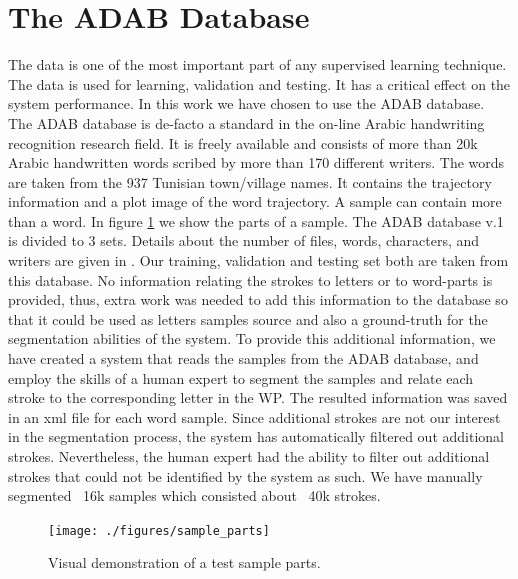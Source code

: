\documentclass[journal,compsoc]{IEEEtran}
\begin{document}
\section{The ADAB Database}
\label{sec:database}
The data is one of the most important part of any supervised learning technique. The data is used for learning, validation and testing. It has a critical effect on the system performance. In this work we have chosen to use the ADAB database. The ADAB database is de-facto a standard in the on-line Arabic handwriting recognition research field. It is freely available and consists of more than 20k Arabic handwritten words scribed by more than 170 different writers. The words are taken from the 937 Tunisian town/village names. It contains the trajectory information and a plot image of the word trajectory. A sample can contain more than a word. In figure \ref{fig:sample_parts} we show the parts of a sample. The ADAB database v.1 is divided to 3 sets. Details about the number of files, words, characters, and writers are given in \cite{el2009icdar}. Our training, validation and testing set both are taken from this database. 
No information relating the strokes to letters or to word-parts is provided, thus, extra work was needed to add this information to the database so that it could be used as letters samples source and also a ground-truth for the segmentation abilities of the system. To provide this additional information, we have created a system that reads the samples from the ADAB database, and employ the skills of a human expert to segment the samples and relate each stroke to the corresponding letter in the WP. The resulted information was saved in an xml file for each word sample. Since additional strokes are not our interest in the segmentation process, the system has automatically filtered out additional strokes. Nevertheless, the human expert had the ability to filter out additional strokes that could not be identified by the system as such. We have manually segmented ~16k samples which consisted about ~40k strokes. 

\begin{figure}
\centering
\texttt{[image: ./figures/sample\_parts]}
\caption{Visual demonstration of a test sample parts.}
\label{fig:sample_parts}
\end{figure}
\end{document}
